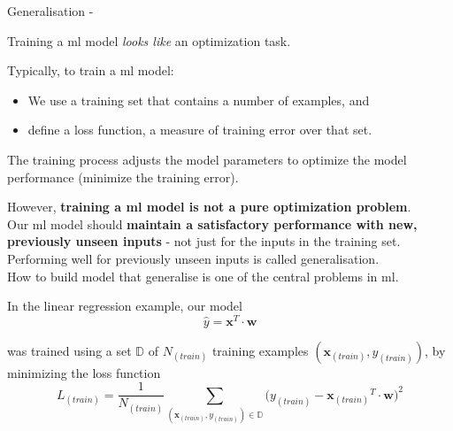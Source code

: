
\begin{frame}[t,allowframebreaks]{Generalisation -}

    Training a \gls{ml} model {\em looks like} an optimization task.\\
    \vspace{0.1cm}
    \begin{blockexample}{}
      Typically, to train a \gls{ml} model: 
      \begin{itemize}
        \item 
        We use a \gls{training set} 
        that contains a number of examples, and
        \item
        define a \gls{loss function},
        a measure of training error over that set.
      \end{itemize}
      The training process adjusts the model parameters
      to optimize the model performance (minimize the training error).\\
    \end{blockexample}
    \vspace{0.2cm}
    However, {\bf training a \gls{ml} model is not a pure optimization problem}.\\
    \vspace{0.2cm}
    Our \gls{ml} model should {\bf maintain a satisfactory performance 
    with new, previously unseen inputs} - 
    not just for the inputs in the training set.\\
    \vspace{0.2cm}
    Performing well for previously unseen inputs is called 
    \gls{generalisation}.\\
    \vspace{0.2cm}
    How to build model that generalise is one of the central problems in \gls{ml}.


    \framebreak


    In the linear regression example, our model
    \begin{equation}
        \hat{y} = {\mathbf x}^T \cdot {\mathbf w}
    \end{equation}        

    was trained using a set $\mathbb{D}$ of $N_{(train)}$
    training examples $({\mathbf x_{(train)}},y_{(train)})$, 
    by minimizing the loss function
    \begin{equation}
        L_{(train)} = \frac{1}{N_{(train)}} 
        \sum_{({\mathbf x_{(train)}},y_{(train)})  \in \mathbb{D}}
        \Big( y_{(train)} - {\mathbf x_{(train)}}^T \cdot {\mathbf w} \Big)^2
    \end{equation}        


\end{frame}

